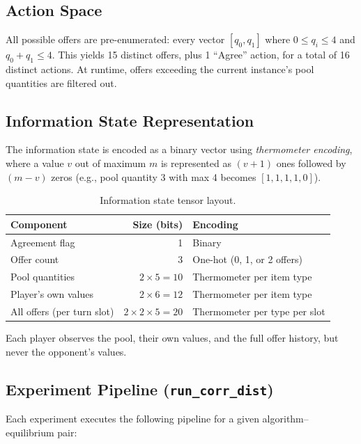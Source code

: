 \documentclass[11pt]{article}
\begin{document}
\subsection{Action Space}

All possible offers are pre-enumerated: every vector $[q_0, q_1]$ where $0 \leq q_i \leq 4$ and $q_0 + q_1 \leq 4$. This yields 15 distinct offers, plus 1 ``Agree'' action, for a total of 16 distinct actions. At runtime, offers exceeding the current instance's pool quantities are filtered out.

\subsection{Information State Representation}

The information state is encoded as a binary vector using \emph{thermometer encoding}, where a value $v$ out of maximum $m$ is represented as $(v+1)$ ones followed by $(m-v)$ zeros (e.g., pool quantity 3 with max 4 becomes $[1,1,1,1,0]$).

\begin{table}[H]
\centering
\begin{tabular}{@{}lrl@{}}
\toprule
\textbf{Component} & \textbf{Size (bits)} & \textbf{Encoding} \\
\midrule
Agreement flag & 1 & Binary \\
Offer count & 3 & One-hot (0, 1, or 2 offers) \\
Pool quantities & $2 \times 5 = 10$ & Thermometer per item type \\
Player's own values & $2 \times 6 = 12$ & Thermometer per item type \\
All offers (per turn slot) & $2 \times 2 \times 5 = 20$ & Thermometer per type per slot \\
\bottomrule
\end{tabular}
\caption{Information state tensor layout.}
\end{table}

Each player observes the pool, their own values, and the full offer history, but never the opponent's values.

\subsection{Experiment Pipeline (\texttt{run\_corr\_dist})}

Each experiment executes the following pipeline for a given algorithm--equilibrium pair:
\end{document}
